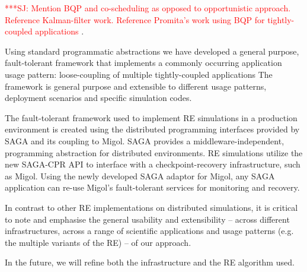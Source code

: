 \documentclass{rspublic}
\newcommand{\jhanote}[1]{ {\textcolor{red} { ***SJ: #1 }}}
\newcommand{\jhanote}[1]{}
\begin{document}
\jhanote{Mention BQP and co-scheduling as opposed to opportunistic
  approach. Reference Kalman-filter work. Reference Promita's work
  using BQP for tightly-coupled applications}.

Using standard programmatic abstractions we have developed a general
purpose, fault-tolerant framework that implements a commonly occurring
application usage pattern: loose-coupling of multiple tightly-coupled
applications The framework is general purpose and extensible to
different usage patterns, deployment scenarios and specific simulation
codes.

The fault-tolerant framework used to implement RE simulations in a
production environment is created using the distributed programming
interfaces provided by SAGA and its coupling to Migol.  SAGA provides
a middleware-independent, programming abstraction for distributed
environments. RE simulations utilize the new SAGA-CPR API to interface
with a checkpoint-recovery infrastructure, such as Migol. Using the
newly developed SAGA adaptor for Migol, any SAGA application can
re-use Migol's fault-tolerant services for monitoring and recovery.


In contrast to other RE implementations on distributed simulations, it
is critical to note and emphasise the general usability and
extensibility -- across different infrastructures, across a range of
scientific applications and usage patterns (e.g.  the multiple
variants of the RE) -- of our approach.
  
In the future, we will refine both the infrastructure and the RE algorithm
used.

\citep{Gallicchio:2007yq}  
                  
\end{document}
